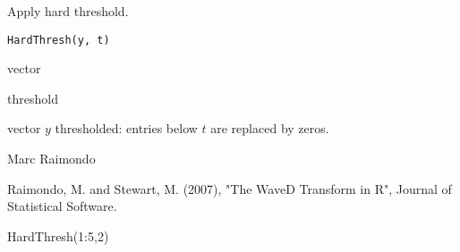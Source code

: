 \documentclass{article}
\begin{document}
\begin{Description}\relax
Apply hard threshold.
\end{Description}
\begin{Usage}
\begin{verbatim}
HardThresh(y, t)
\end{verbatim}
\end{Usage}
\begin{Arguments}
\begin{ldescription}
\item[\code{y}] vector
\item[\code{t}] threshold 
\end{ldescription}
\end{Arguments}
\begin{Value}
vector $y$ thresholded:  entries below $t$ are replaced by zeros.
\end{Value}
\begin{Author}\relax
Marc Raimondo
\end{Author}
\begin{References}\relax
Raimondo, M. and Stewart, M. (2007),
"The WaveD Transform in R", Journal of Statistical Software.
\end{References}
\begin{SeeAlso}\relax
{}
\end{SeeAlso}
\begin{Examples}
\begin{ExampleCode}
HardThresh(1:5,2)
  \end{ExampleCode}
\end{Examples}
\end{document}
